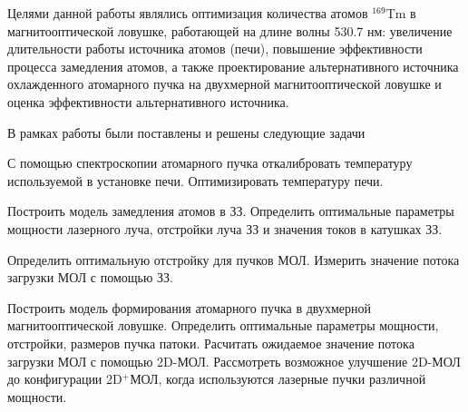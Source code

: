 




Целями данной работы являлись оптимизация количества атомов ${}^{169}$Tm в магнитооптической ловушке, работающей на длине волны 530.7 нм: увеличение длительности работы источника атомов (печи), повышение эффективности процесса замедления атомов, а также проектирование альтернативного источника охлажденного атомарного пучка на двухмерной магнитооптической ловушке и оценка эффективности альтернативного источника.

В рамках работы были поставлены и решены следующие задачи 
\begin{enumerate*}
	\item С помощью спектроскопии атомарного пучка откалибровать температуру используемой в установке печи. Оптимизировать температуру печи.
	\item Построить модель замедления атомов в ЗЗ. Определить оптимальные параметры мощности лазерного луча, отстройки луча ЗЗ и значения токов в катушках ЗЗ. 
	\item Определить оптимальную отстройку для пучков МОЛ. Измерить значение потока загрузки МОЛ с помощью ЗЗ. 
	\item Построить модель формирования атомарного пучка в двухмерной магнитооптической ловушке. Определить оптимальные параметры мощности, отстройки, размеров пучка патоки. Расчитать ожидаемое значение потока загрузки МОЛ с помощью 2D-МОЛ. Рассмотреть возможное улучшение 2D-МОЛ до конфигурации 2D${}^+$МОЛ, когда используются лазерные пучки различной мощности. 
\end{enumerate*}


